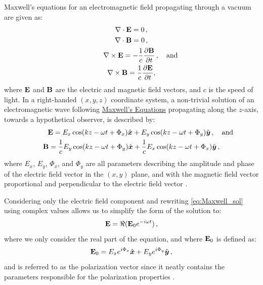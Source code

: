 Maxwell's equations for an electromagnetic field propagating through a vacuum are given as:
\begin{equation}
    \begin{gathered}
        \nabla \cdot \matr{E} = 0\,,\\
        \nabla \cdot \matr{B} = 0\,,\\
        \nabla \times \matr{E} = - \frac{1}{c} \frac{\partial \matr{B}}{\partial t}\,,\rlap{\quad and}\\
        \nabla \times \matr{B} = \frac{1}{c} \frac{\partial \matr{E}}{\partial t},
    \end{gathered}\label{eq:Maxwell}
\end{equation}
where $\mathbf{E}$ and $\mathbf{B}$ are the electric and magnetic field vectors, and $c$ is the speed of light. In a right-handed $(x, y, z)$ coordinate system, a non-trivial solution of an electromagnetic wave following \hyperref[eq:Maxwell]{Maxwell's Equations} propagating along the $z$-axis, towards a hypothetical observer, is described by:
\begin{equation}
    \begin{gathered}
        \matr{E} = E_{x} \cos(kz - \omega t + \Phi_{x}) \hat{\boldsymbol{x}} +
        E_{y} \cos(kz - \omega t + \Phi_{y}) \hat{\boldsymbol{y}}\,,\rlap{\quad and}\\
        \matr{B} = \frac{1}{c} E_{y} \cos(kz - \omega t + \Phi_{y}) \hat{\boldsymbol{x}} +
        \frac{1}{c} E_{x} \cos(kz - \omega t + \Phi_{x}) \hat{\boldsymbol{y}}\,,
    \end{gathered}\label{eq:Maxwell_sol}
\end{equation}
where $E_{x}$, $E_{y}$, $\Phi_{x}$, and $\Phi_{y}$ are all parameters describing the amplitude and phase of the electric field vector in the $(x, y)$ plane, and with the magnetic field vector proportional and perpendicular to the electric field vector \citep{Griffiths}.

Considering only the electric field component and rewriting \autoref{eq:Maxwell_sol} using complex values allows us to simplify the form of the solution to:
\begin{equation}
    \mathbf{E} = \Re(\mathbf{E}_{0} e^{-i \omega t})\,,\label{eq:E_field_vector}
\end{equation}
where we only consider the real part of the equation, and where $\mathbf{E}_{0}$ is defined as:
\begin{equation}
    \mathbf{E}_{0} = E_{x} e^{i \Phi_{x}} \hat{\boldsymbol{x}} +
    E_{y} e^{i \Phi_{y}} \hat{\boldsymbol{y}}\,,\label{eq:pol_vector}
\end{equation}
and is referred to as the polarization vector since it neatly contains the parameters responsible for the polarization properties \citep{pol_phys}.


